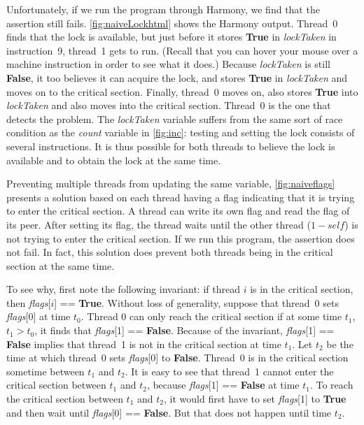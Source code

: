 \documentclass{report}
\begin{document}
Unfortunately, if we run the program through Harmony,
we find that the assertion still fails.
\autoref{fig:naiveLockhtml} shows the Harmony output.
Thread~0 finds that the lock is available, but just before it stores
\textbf{True} in \textit{lockTaken} in instruction~9, thread~1 gets
to run.
(Recall that you can hover your mouse over a machine instruction in order
to see what it does.)
Because \textit{lockTaken} is still \textbf{False}, it too
believes it can acquire the lock, and stores \textbf{True} in
\textit{lockTaken} and moves on to the critical section.
Finally, thread~0 moves on, also stores \textbf{True}
into \textit{lockTaken} and also moves
into the critical section.  Thread~0 is the one that detects the
problem.
The \textit{lockTaken} variable
suffers from the same sort of race condition as the \textit{count} variable
in \autoref{fig:inc}: testing and setting the lock
consists of several instructions.  It is thus possible
for both threads to believe the lock is available and to obtain the lock
at the same time.

Preventing multiple threads from updating the same variable,
\autoref{fig:naiveflags} presents a solution based on each thread having
a flag indicating that it is trying to enter the critical section.
A thread can write its own flag and read the flag of its peer.
After setting its flag, the thread waits until the other thread
($1 - \mathit{self}$) is not trying to enter the critical section.
If we run this program, the assertion does not fail.  In fact, this
solution does prevent both threads being in the critical section at
the same time.

To see why, first note the following invariant: if thread $i$ is in the
critical section, then \textit{flags}[$i$] == \textbf{True}.
Without loss of generality,
suppose that thread~0 sets \textit{flags}[0] at time $t_0$.
Thread 0 can only reach the critical section if at some time $t_1$,
$t_1 > t_0$, it finds that \textit{flags}[1] == \textbf{False}.
Because of the invariant, \textit{flags}[1] == \textbf{False} implies that
thread~1 is not in the critical section at time $t_1$.
Let $t_2$ be the time at which thread~0 sets \textit{flags}[0]
to \textbf{False}.  Thread~0 is in the critical section sometime
between $t_1$ and $t_2$.
It is easy to see that thread~1 cannot enter the critical section
between $t_1$ and $t_2$, because \textit{flags}[1] == \textbf{False} at
time $t_1$.  To reach the critical section between $t_1$ and $t_2$,
it would first have to set \textit{flags}[1] to \textbf{True} and
then wait until \textit{flags}[0] == \textbf{False}.  But that does not happen
until time $t_2$.
\end{document}
